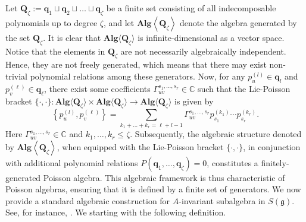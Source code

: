 \documentclass[11pt,reqno]{amsart}
\newtheorem*{theorem A}{Main Theorem A}
\newtheorem*{theorem B}{Main Theorem B}
\newtheorem*{theorem C}{Main Theorem C}
\newtheorem*{theorem D}{Main Theorem D}
\theoremstyle{definition}
\theoremstyle{plain}
\theoremstyle{conclusion}
\begin{document}
 Let $\textbf{Q}_\zeta :=    \textbf{q}_1 \sqcup \textbf{q}_2 \sqcup \ldots \sqcup \textbf{q}_\zeta $ be a finite set consisting of all indecomposable polynomials up to degree $\zeta$, and let $\textbf{Alg} \left\langle \textbf{Q}_\zeta \right\rangle $ denote the algebra generated by the set $\textbf{Q}_\zeta$. %
  It is clear that $\textbf{Alg}\langle\textbf{Q}_\zeta\rangle$ is infinite-dimensional as a vector space.  Notice that the elements in $\textbf{Q}_\zeta$ are not necessarily algebraically independent. Hence, they are not freely generated, which means that there may exist non-trivial polynomial relations among these generators. Now, for any $p_u^{(l)} \in \textbf{q}_l$ and $p_v^{(\ell)} \in \textbf{q}_\ell$, there exist some coefficients $ \Gamma^{s_1,...,s_r}_{uv}  \in \mathbb{C}$ such that the Lie-Poisson bracket $\{\cdot,\cdot\}  :  \textbf{Alg} \langle  \textbf{Q}_\zeta \rangle \times \textbf{Alg} \langle  \textbf{Q}_\zeta \rangle\rightarrow \textbf{Alg} \langle  \textbf{Q}_\zeta \rangle$ is given by \begin{equation}
     \left\{p_u^{(l)} ,p_v^{(\ell)} \right\}= \sum_{k_1+\ldots +  k_r =\ell+l-1} \Gamma^{s_1,...,s_r}_{uv} p_{s_1}^{(k_1)} \cdots p_{s_r}^{(k_r)}  . \label{eq:comm}
\end{equation} Here $ \Gamma^{s_1,...,s_r}_{uv} \in \mathbb{C}$ and $k_1,\ldots,k_r  \leq \zeta.$ Subsequently, the algebraic structure denoted by $\textbf{Alg}\left\langle \textbf{Q}_\zeta\right\rangle$, when equipped with the Lie-Poisson bracket $\{\cdot,\cdot\}$, in conjunction with additional polynomial relations $ P(\textbf{q}_1,\ldots,\textbf{q}_\zeta) = 0$, constitutes a finitely-generated Poisson algebra. This algebraic framework is thus characteristic of Poisson algebras, ensuring that it is defined by a finite set of generators.  %
We now provide a standard algebraic construction for $A$-invariant subalgebra in $S(\mathfrak{g})$. See, for instance, \cite[Chapter 2]{michor1996isometric}. We starting with the following definition.
 
\end{document}
